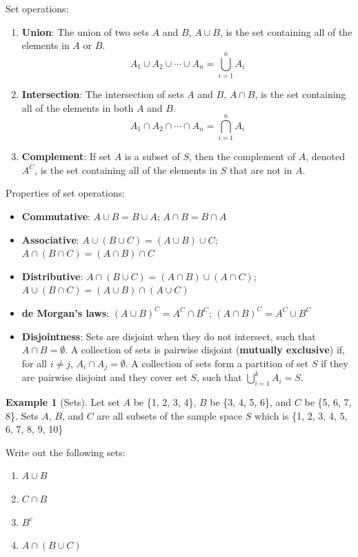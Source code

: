 \documentclass[
]{book}
\providecommand{\tightlist}{%
  \setlength{\itemsep}{0pt}\setlength{\parskip}{0pt}}
\theoremstyle{definition}
\theoremstyle{definition}
\newtheorem{example}{Example}[chapter]
\theoremstyle{definition}
\theoremstyle{definition}
\theoremstyle{remark}
\begin{document}
Set operations:

\begin{enumerate}
\def\labelenumi{\arabic{enumi}.}
\tightlist
\item
  \textbf{Union}: The union of two sets \(A\) and \(B\), \(A \cup B\), is the set containing all of the elements in \(A\) or \(B\). \[A_1 \cup A_2  \cup \cdots \cup A_n = \bigcup_{i=1}^n A_i\]
\item
  \textbf{Intersection}: The intersection of sets \(A\) and \(B\), \(A \cap B\), is the set containing all of the elements in both \(A\) and \(B\). \[A_1 \cap A_2  \cap \cdots \cap A_n = \bigcap_{i=1}^n A_i\]
\item
  \textbf{Complement}: If set \(A\) is a subset of \(S\), then the complement of \(A\), denoted \(A^C\), is the set containing all of the elements in \(S\) that are not in \(A\).
\end{enumerate}

Properties of set operations:

\begin{itemize}
\tightlist
\item
  \textbf{Commutative}: \(A \cup B = B \cup A\); \(A \cap B = B \cap A\)
\item
  \textbf{Associative}: \(A \cup (B \cup C) = (A \cup B) \cup C\); \(A \cap (B \cap C) = (A \cap B) \cap C\)
\item
  \textbf{Distributive}: \(A \cap (B \cup C) = (A \cap B) \cup (A \cap C)\); \(A \cup (B \cap C) = (A \cup B) \cap (A \cup C)\)
\item
  \textbf{de Morgan's laws}: \((A \cup B)^C = A^C \cap B^C\); \((A \cap B)^C = A^C \cup B^C\)
\item
  \textbf{Disjointness}: Sets are disjoint when they do not intersect, such that \(A \cap B = \emptyset\). A collection of sets is pairwise disjoint (\textbf{mutually exclusive}) if, for all \(i \neq j\), \(A_i \cap A_j = \emptyset\). A collection of sets form a partition of set \(S\) if they are pairwise disjoint and they cover set \(S\), such that \(\bigcup_{i = 1}^k A_i = S\).
\end{itemize}

\begin{example}[Sets]
\protect\hypertarget{exm:sets}{}{\label{exm:sets} {} }
Let set \(A\) be \{1, 2, 3, 4\}, \(B\) be \{3, 4, 5, 6\}, and \(C\) be \{5, 6, 7, 8\}. Sets \(A\), \(B\), and \(C\) are all subsets of the sample space \(S\) which is \{1, 2, 3, 4, 5, 6, 7, 8, 9, 10\}

Write out the following sets:

\begin{enumerate}
\def\labelenumi{\arabic{enumi}.}
\tightlist
\item
  \(A \cup B\)
\item
  \(C \cap B\)
\item
  \(B^c\)
\item
  \(A \cap (B \cup C)\)
\end{enumerate}
\end{example}
\end{document}
